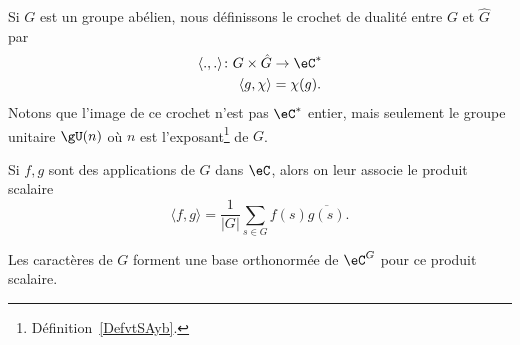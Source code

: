 Si \( G\) est un groupe abélien, nous définissons le crochet de dualité entre \( G\) et \( \hat G\) par
\begin{equation}
    \begin{aligned}
        \langle ., .\rangle \colon G\times \hat G&\to \eC^* \\
        \langle g, \chi\rangle &=\chi(g).
    \end{aligned}
\end{equation}
Notons que l'image de ce crochet n'est pas \( \eC^*\) entier, mais seulement le groupe unitaire \( \gU(n)\) où \( n\) est l'exposant\footnote{Définition~\ref{DefvtSAyb}.} de \( G\).


Si \( f,g\) sont des applications de \( G\) dans \( \eC\), alors on leur associe le produit scalaire
\begin{equation}
    \langle f, g\rangle =\frac{1}{ | G | }\sum_{s\in G}f(s)\overline{ g(s) }.
\end{equation}

\begin{lemma}
    Les caractères de \( G\) forment une base orthonormée de \( \eC^G\) pour ce produit scalaire.
\end{lemma}

